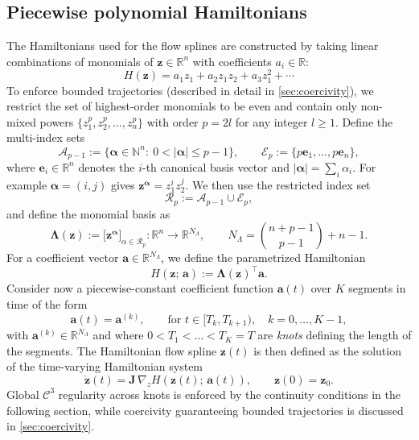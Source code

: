 \documentclass[11pt, a4paper]{article}
\theoremstyle{plain}
\theoremstyle{definition}
\theoremstyle{remark}
\begin{document}
\subsection{Piecewise polynomial Hamiltonians}

The Hamiltonians used for the flow splines are constructed by taking linear combinations of monomials of $\mathbf{z} \in \mathbb R^{n}$ with coefficients $a_i \in \mathbb R$:
\[
H(\mathbf{z}) = a_1 z_1 + a_2 z_1 z_2 + a_3 z_1^2 + \cdots
\]
To enforce bounded trajectories (described in detail in \cref{sec:coercivity}), we restrict the set of highest-order monomials to be even and contain only non-mixed powers $\{z_1^p,z_2^p,\dots,z_{n}^p\}$ with order $p=2l$ for any integer $l\geq 1$. Define the multi-index sets 
\[
\mathcal A_{p-1}:=\{\boldsymbol{\alpha}\in\mathbb N^n:\ 0<|\boldsymbol{\alpha}|\le p-1\},
\qquad
\mathcal E_p:=\{p \mathbf{e}_1,\dots,p \mathbf{e}_{n}\},
\]
where \(\mathbf{e}_i\in\mathbb R^n\) denotes the \(i\)-th canonical basis vector and $|\boldsymbol{\alpha}| = \sum_i \alpha_i$. For example $\boldsymbol{\alpha} = (i,j)$ gives $\mathbf{z}^{\boldsymbol{\alpha}} = z_1^iz_2^j$. We then use the restricted index set
\begin{equation}
    \mathcal R_p:=\mathcal A_{p-1}\cup \mathcal E_p,
    \label{eq:index_set}
\end{equation}
and define the monomial basis as
\[
\boldsymbol{\Lambda}(\mathbf{z}):=\big[\mathbf{z}^{\boldsymbol{\alpha}}\big]_{\alpha \in \mathcal R_p} : \mathbb R^n \rightarrow \mathbb R^{N_\Lambda},
\qquad
N_\Lambda=\binom{n+p-1}{p-1} + n -1.
\]
For a coefficient vector \(\mathbf{a}\in\mathbb{R}^{N_\Lambda}\), we define the parametrized Hamiltonian
\[
H(\mathbf{z};\,\mathbf{a}):=\boldsymbol{\Lambda}(\mathbf{z})^\top \mathbf{a} .
\]
Consider now a piecewise-constant coefficient
function \(\mathbf{a}(t)\) over $K$ segments in time of the form
\[
\mathbf{a}(t)=\mathbf{a}^{(k)},\qquad \text{for } t\in[T_k,T_{k+1}),\quad k=0,\dots,K-1,
\]
with \(\mathbf{a}^{(k)}\in\mathbb{R}^{N_\Lambda}\) and where  $0<T_1< \dots < T_K = T$ are \textit{knots} defining the length of the segments.
The Hamiltonian flow spline \(\mathbf{z}(t)\) is then defined as the solution of the time-varying Hamiltonian system
\begin{equation}
\dot{\mathbf{z}}(t)=\mathbf{J}\,\nabla_z H\!\left(\mathbf{z}(t);\,\mathbf{a}(t)\right),\qquad \mathbf{z}(0)=\mathbf{z}_0.
\label{eq:hamiltonian_sys_at}
\end{equation}
 Global \(\mathcal C^3\) regularity across knots is enforced by the continuity conditions in the following section, while coercivity guaranteeing bounded trajectories is discussed in \cref{sec:coercivity}.
\end{document}
